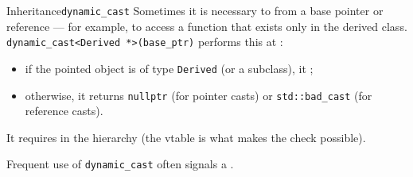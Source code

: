 \begin{frame}{Inheritance}{\texttt{dynamic\_cast}}
	\justifying
	Sometimes it is necessary to  from a base pointer or reference — for example, to access a function that exists only in the derived class.\\
	\bigskip
	\texttt{dynamic\_cast<Derived *>(base\_ptr)} performs this at :
	\begin{itemize}
		\item if the pointed object is of type \texttt{Derived} (or a subclass), it ;
		\item otherwise, it returns \texttt{nullptr} (for pointer casts) or  \texttt{std::bad\_cast} (for reference casts).
	\end{itemize}
	\bigskip
	It requires  in the hierarchy (the vtable is what makes the check possible).\\
	\bigskip
	\begin{alertblock}{}
		\centering
		Frequent use of \texttt{dynamic\_cast} often signals a .
	\end{alertblock}
\end{frame}
